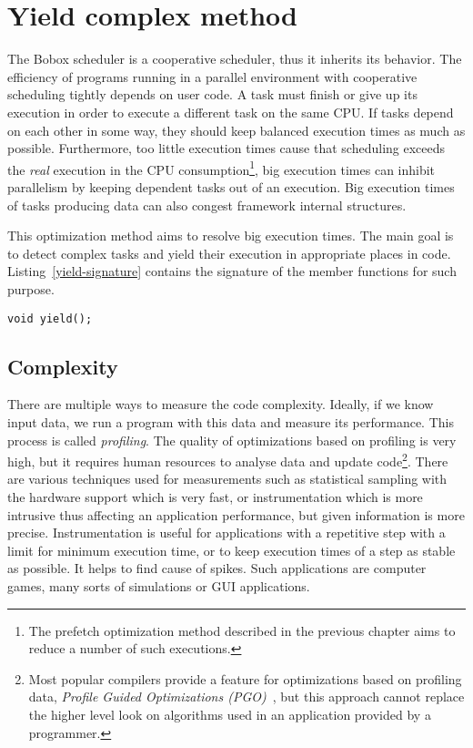 \chapter{Yield complex method}
\label{yield-intro}
The Bobox scheduler is a cooperative scheduler, thus it inherits its behavior. The efficiency of programs running in a parallel environment with cooperative scheduling tightly depends on user code. A task must finish or give up its execution in order to execute a different task on the same CPU. If tasks depend on each other in some way, they should keep balanced execution times as much as possible. Furthermore, too little execution times cause that scheduling exceeds the \textit{real} execution in the CPU consumption\footnote{The prefetch optimization method described in the previous chapter aims to reduce a number of such executions.}, big execution times can inhibit parallelism by keeping dependent tasks out of an execution. Big execution times of tasks producing data can also congest framework internal structures.

This optimization method aims to resolve big execution times. The main goal is to detect complex tasks and yield their execution in appropriate places in code. Listing~\ref{yield-signature} contains the signature of the  member functions for such purpose.

\begin{lstlisting}[caption={The signature of the yield execution function.}, label={yield-signature}]
void yield();
\end{lstlisting}

\section{Complexity}
\label{yield-complexity}
There are multiple ways to measure the code complexity. Ideally, if we know input data, we run a program with this data and measure its performance. This process is called \emph{profiling}. The quality of optimizations based on profiling is very high, but it requires human resources to analyse data and update code\footnote{Most popular compilers provide a feature for optimizations based on profiling data, \emph{Profile Guided Optimizations (PGO)}~\cite{pgo}, but this approach cannot replace the higher level look on algorithms used in an application provided by a programmer.}. There are various techniques used for measurements such as statistical sampling with the hardware support which is very fast, or instrumentation which is more intrusive thus affecting an application performance, but given information is more precise. Instrumentation is useful for applications with a repetitive step with a limit for minimum execution time, or to keep execution times of a step as stable as possible. It helps to find cause of spikes. Such applications are computer games, many sorts of simulations or GUI applications.

